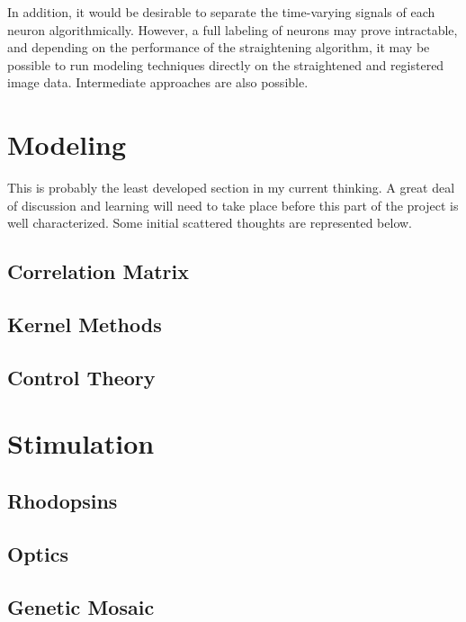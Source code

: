 \documentclass[letter,11pt]{article}
\begin{document}
In addition, it would be desirable to separate the time-varying signals of each neuron
algorithmically. However, a full labeling of neurons may prove intractable, and depending
on the performance of the straightening algorithm, it may be possible to run modeling
techniques directly on the straightened and registered image data. Intermediate approaches
are also possible.


\section{Modeling}

This is probably the least developed section in my current thinking. A great deal
of discussion and learning will need to take place before this part of the project is
well characterized. Some initial scattered thoughts are represented below.

\subsection{Correlation Matrix}

\subsection{Kernel Methods}


\subsection{Control Theory}



\section{Stimulation}
\label{stimulation}

\subsection{Rhodopsins}

\subsection{Optics}

\subsection{Genetic Mosaic}
\end{document}

